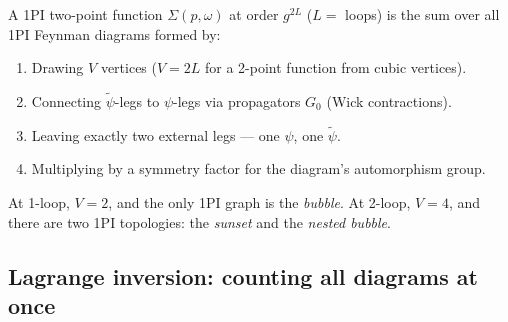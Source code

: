 \documentclass[11pt,a4paper]{article}
\theoremstyle{definition}
\theoremstyle{plain}
\begin{document}
\begin{stdbox}
A 1PI two-point function $\Sigma(p,\omega)$ at order $g^{2L}$ ($L =$
loops) is the sum over all 1PI Feynman diagrams formed by:
\begin{enumerate}[leftmargin=2em]
  \item Drawing $V$ vertices ($V = 2L$ for a 2-point function from
    cubic vertices).
  \item Connecting $\tilde\psi$-legs to $\psi$-legs via propagators
    $G_0$ (Wick contractions).
  \item Leaving exactly two external legs --- one $\psi$, one
    $\tilde\psi$.
  \item Multiplying by a symmetry factor for the diagram's
    automorphism group.
\end{enumerate}
At 1-loop, $V = 2$, and the only 1PI graph is the \emph{bubble}.  At
2-loop, $V = 4$, and there are two 1PI topologies: the \emph{sunset}
and the \emph{nested bubble}.
\end{stdbox}

\subsection{Lagrange inversion: counting all diagrams at once}
\label{app:lagrange-walk}
\end{document}

